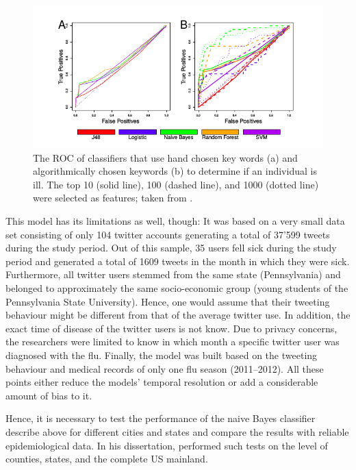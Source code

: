 \documentclass[11pt, a4paper,twoside]{report}\usepackage[]{graphicx}\usepackage[]{color}
\begin{document}
\begin{figure}[H]
  \centering
    \includegraphics[width=.9\textwidth]{ROC_classification_seed.png}
  \caption{The ROC of classifiers that use hand chosen key words (a) and algorithmically chosen keywords (b) to determine if an individual is ill. The top 10 (solid line), 100 (dashed line), and 1000 (dotted line) were selected as features; taken from \cite{bodnar_ground_2014}.}
  \label{fig:ROC_classification_seed}
  \end{figure}

This model has its limitations as well, though: It was based on a very small data set consisting of only 104 twitter accounts generating a total of 37’599 tweets during the study period. Out of this sample, 35 users fell sick during the study period and generated a total of 1609 tweets in the month in which they were sick. Furthermore, all twitter users stemmed from the same state (Pennsylvania) and belonged to approximately the same socio-economic group (young students of the Pennsylvania State University). Hence, one would assume that their tweeting behaviour might be different from that of the average twitter use. In addition, the exact time of disease of the twitter users is not know. Due to privacy concerns, the researchers were limited to know in which month a specific twitter user was diagnosed with the flu. Finally, the model was built based on the tweeting behaviour and medical records of only one flu season (2011--2012). All these points either reduce the models' temporal resolution or add a considerable amount of bias to it.

Hence, it is necessary to test the performance of the naive Bayes classifier describe above for different cities and states and compare the results with reliable epidemiological data. In his dissertation, \cite{bodnar_data_2015} performed such tests on the level of counties, states, and the complete US mainland.
\end{document}
